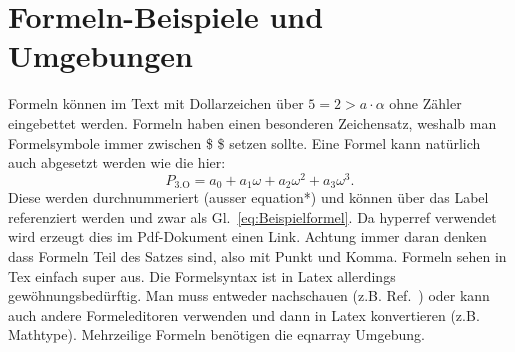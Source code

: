 \section{Formeln-Beispiele und Umgebungen}\label{sec:Formeln}
Formeln können im Text mit Dollarzeichen über $5=2>a\cdot \alpha$ ohne Zähler eingebettet werden. Formeln haben einen besonderen Zeichensatz, weshalb man Formelsymbole immer zwischen \$ \$ setzen sollte. Eine Formel kann natürlich auch abgesetzt werden wie die hier:
\begin{equation}\label{eq:Beispielformel}
P_\text{3.O} = a_0 +a_1\omega + a_2 \omega^2 +a_3\omega^3.
\end{equation}
Diese werden durchnummeriert (ausser equation*) und können über das Label referenziert werden und zwar als Gl.~\ref{eq:Beispielformel}. Da hyperref verwendet wird erzeugt dies im Pdf-Dokument einen Link. Achtung immer daran denken dass Formeln Teil des Satzes sind, also mit Punkt und Komma. Formeln sehen in Tex einfach super aus. Die Formelsyntax ist in Latex allerdings gewöhnungsbedürftig. Man muss entweder nachschauen (z.B. Ref.~\cite{wiki_book,BeuermannSascha2002EvlP}) oder kann auch andere Formeleditoren verwenden und dann in Latex konvertieren (z.B. Mathtype). Mehrzeilige Formeln benötigen die eqnarray Umgebung.
